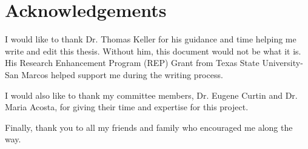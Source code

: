 \documentclass[main.tex]{subfiles}
\begin{document}
\chapter{Acknowledgements}

I would like to thank Dr. Thomas Keller for his guidance and time helping me write and edit this thesis. Without him, this document would not be what it is. His Research Enhancement Program (REP) Grant from Texas State University-San Marcos helped support me during the writing process.

I would also like to thank my committee members, Dr. Eugene Curtin and Dr. Maria Acosta, for giving their time and expertise for this project.

Finally, thank you to all my friends and family who encouraged me along the way.
\end{document}
